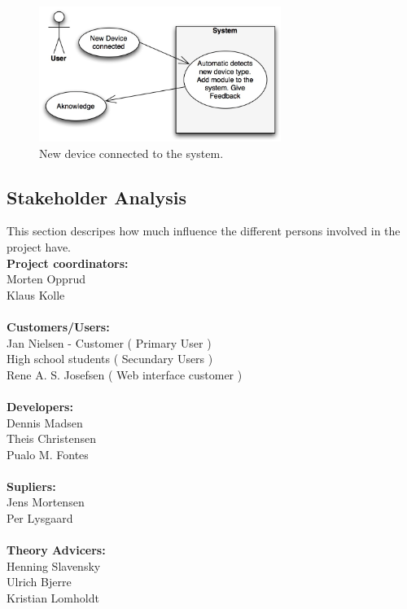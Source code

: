 \begin{figure}[!h]
	\begin{centering}
		\includegraphics[width=0.7\textwidth]{images/usecases2.jpg}
		\caption{New device connected to the system. }
	\end{centering}
\end{figure}
\newpage

\subsection{Stakeholder Analysis}
This section descripes how much influence the different persons
involved in the project have.\\[0.2cm]
\textbf{Project coordinators:}\\ Morten Opprud\\ Klaus Kolle\\
\\
\textbf{Customers/Users:}\\
Jan Nielsen - Customer ( Primary User )\\
High school students ( Secundary Users )\\
Rene A. S. Josefsen ( Web interface customer )\\
\\
\textbf{Developers:}\\
Dennis Madsen\\
Theis Christensen\\
Pualo M. Fontes\\
\\
\textbf{Supliers:}\\
Jens Mortensen\\
Per Lysgaard\\
\\
\textbf{Theory Advicers:}\\
Henning Slavensky\\
Ulrich Bjerre\\
Kristian Lomholdt\\

